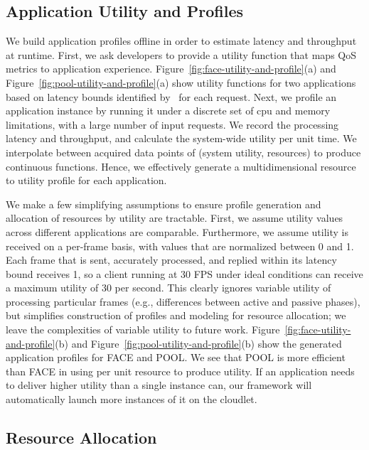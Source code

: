 \subsection{Application Utility and Profiles}

We build application profiles offline in order to estimate latency and
throughput at runtime. First, we ask developers to provide a utility
function that maps QoS metrics to application experience.
Figure~\ref{fig:face-utility-and-profile}(a) and
Figure~\ref{fig:pool-utility-and-profile}(a) show utility functions
for two applications based on latency bounds identified
by~\cite{chen2017empirical} for each request. Next, we profile an application
instance by running it under a discrete set of cpu and memory
limitations, with a large number of input requests. We record the
processing latency and throughput, and calculate the system-wide
utility per unit time. We interpolate between acquired data points of
(system utility, resources) to produce continuous functions.  Hence,
we effectively generate a multidimensional resource to utility profile
for each application.

We make a few simplifying assumptions to ensure profile generation and
allocation of resources by utility are tractable.  First, we assume
utility values across different applications are comparable.
Furthermore, we assume utility is received on a per-frame basis, with
values that are normalized between 0 and 1.  Each frame that is sent,
accurately processed, and replied within its latency bound receives 1,
so a client running at 30 FPS under ideal conditions can receive a
maximum utility of 30 per second.  This clearly ignores variable
utility of processing particular frames (e.g., differences between
active and passive phases), but simplifies construction of profiles
and modeling for resource allocation; we leave the complexities of
variable utility to future work.
Figure~\ref{fig:face-utility-and-profile}(b) and
Figure~\ref{fig:pool-utility-and-profile}(b) show the generated
application profiles for FACE and POOL. We see that POOL is more efficient
than FACE in using per unit resource to produce utility. If an
application needs to deliver higher utility than a single instance
can, our framework will automatically launch more instances of it on
the cloudlet.


\subsection{Resource Allocation}

